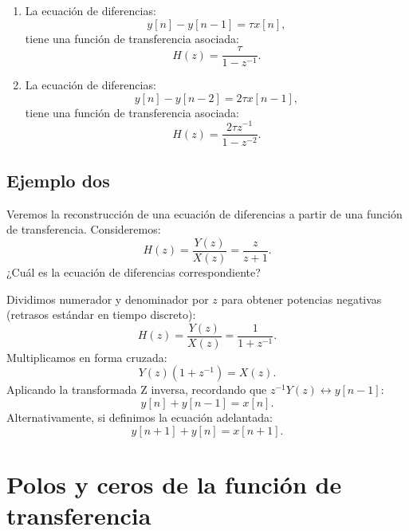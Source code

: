 \documentclass[11pt,a4paper,openany]{book}
\begin{document}
\begin{enumerate}
	\item La ecuaci\'{o}n de diferencias:
	\begin{equation}
		y[n] - y[n-1] = \tau x[n],
	\end{equation}
	tiene una funci\'{o}n de transferencia asociada:
	\begin{equation}
		H(z) = \frac{\tau}{1-z^{-1}}.
	\end{equation}
	
	\item La ecuaci\'{o}n de diferencias:
	\begin{equation}
		y[n] - y[n-2] = 2 \tau x[n-1],
	\end{equation}
	tiene una funci\'{o}n de transferencia asociada:
	\begin{equation}
		H(z) = \frac{2 \tau z^{-1}}{1-z^{-2}}.
	\end{equation}
\end{enumerate}

\subsection{Ejemplo dos}

Veremos la reconstrucci\'{o}n de una ecuaci\'{o}n de diferencias a partir de una funci\'{o}n de transferencia. Consideremos:
\begin{equation}
	H(z) = \frac{Y(z)}{X(z)} = \frac{z}{z+1}.
\end{equation}
¿Cu\'{a}l es la ecuaci\'{o}n de diferencias correspondiente?

Dividimos numerador y denominador por $z$ para obtener potencias negativas (retrasos estándar en tiempo discreto):
\begin{equation}
	H(z) = \frac{Y(z)}{X(z)} = \frac{1}{1 + z^{-1}}.
\end{equation}
Multiplicamos en forma cruzada:
\begin{equation}
	Y(z) (1 + z^{-1}) = X(z).
\end{equation}
Aplicando la transformada Z inversa, recordando que $z^{-1} Y(z) \leftrightarrow y[n-1]$:
\begin{equation}
	y[n] + y[n-1] = x[n].
\end{equation}
Alternativamente, si definimos la ecuación adelantada:
\begin{equation}
	y[n+1] + y[n] = x[n+1].
\end{equation}

\section{Polos y ceros de la funci\'{o}n de transferencia}
\end{document}
